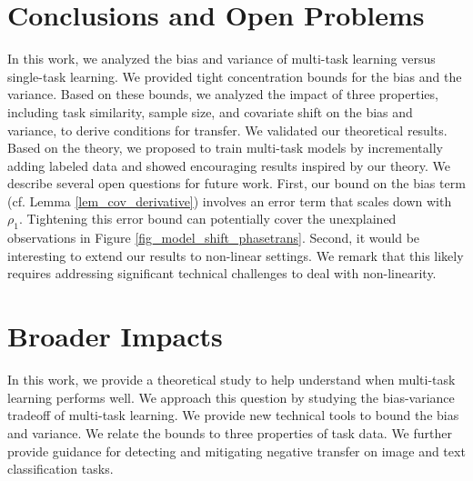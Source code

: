 \vspace{-0.05in}
\section{Conclusions and Open Problems}
\vspace{-0.05in}

In this work, we analyzed the bias and variance of multi-task learning versus single-task learning.
We provided tight concentration bounds for the bias and the variance.
Based on these bounds, we analyzed the impact of three properties, including task similarity, sample size, and covariate shift on the bias and variance, to derive conditions for transfer.
We validated our theoretical results.
Based on the theory, we proposed to train multi-task models by incrementally adding labeled data and showed encouraging results inspired by our theory.
We describe several open questions for future work.
First, our bound on the bias term (cf. Lemma \ref{lem_cov_derivative}) involves an error term that scales down with $\rho_1$.
Tightening this error bound can potentially cover the unexplained observations in Figure \ref{fig_model_shift_phasetrans}.
Second, it would be interesting to extend our results to non-linear settings.
We remark that this likely requires addressing significant technical challenges  to deal with non-linearity.

\newpage
\section*{Broader Impacts}

In this work, we provide a theoretical study to help understand when multi-task learning performs well.
We approach this question by studying the bias-variance tradeoff of multi-task learning.
We provide new technical tools to bound the bias and variance.
We relate the bounds to three properties of task data.
We further provide guidance for detecting and mitigating negative transfer on image and text classification tasks.

